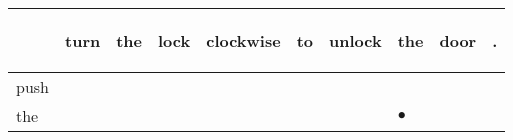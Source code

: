 \documentclass[landscape]{article}
\newcommand{\ssp}{\hspace{2pt}}
\newcommand{\mex}{\cellcolor{g}$\bullet$}
\begin{document}
\noindent\begin{tabular}{|l|p{10pt}|p{10pt}|p{10pt}|p{10pt}|p{10pt}|p{10pt}|p{10pt}|p{10pt}|p{10pt}|}
\hline
&\begin{sideways}\cellcolor{ref0}turn\hspace{12pt}\end{sideways}&\begin{sideways}\cellcolor{ref1}the\hspace{12pt}\end{sideways}&\begin{sideways}\cellcolor{ref2}lock\hspace{12pt}\end{sideways}&\begin{sideways}\cellcolor{ref3}clockwise\hspace{12pt}\end{sideways}&\begin{sideways}\cellcolor{ref4}to\hspace{12pt}\end{sideways}&\begin{sideways}\cellcolor{ref5}unlock\hspace{12pt}\end{sideways}&\begin{sideways}\cellcolor{ref6}the\hspace{12pt}\end{sideways}&\begin{sideways}\cellcolor{ref7}door\hspace{12pt}\end{sideways}&\begin{sideways}\cellcolor{ref8}.\hspace{12pt}\end{sideways}\\
\hline
\ssp push \ssp&\hspace{2pt}&\hspace{2pt}&\hspace{2pt}&\hspace{2pt}&\hspace{2pt}&\hspace{2pt}&\hspace{2pt}&\hspace{2pt}&\hspace{2pt}\\
\hline
\ssp \cellcolor{ref6}the \ssp&\hspace{2pt}&\hspace{2pt}&\hspace{2pt}&\hspace{2pt}&\hspace{2pt}&\hspace{2pt}&\hspace{2pt}\mex&\hspace{2pt}&\hspace{2pt}\\

\end{tabular}
\end{document}
